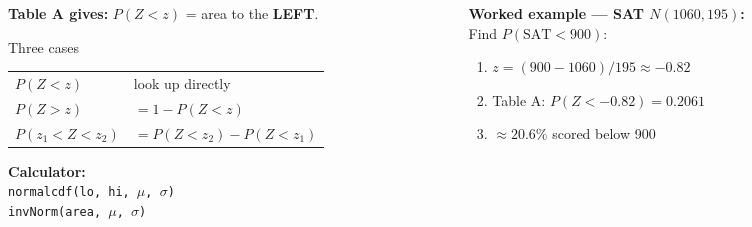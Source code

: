 \documentclass[aspectratio=169, 11pt]{beamer}
\begin{document}
{
\begin{frame}[t, plain]
  \vspace{0.45cm}\par
  \hspace{0.55cm}%
  \begin{minipage}{0.9\textwidth}


    \begin{columns}[T]
      \begin{column}{0.50\textwidth}
        \small
        \textbf{Table A gives:} $P(Z < z)$ = area to the \textbf{LEFT}.

        \vspace{0.5em}
        \begin{block}{Three cases}
          \small
          \renewcommand{\arraystretch}{1.4}
          \begin{tabular}{ll}
          $P(Z < z)$         & look up directly \\
          $P(Z > z)$         & $= 1 - P(Z < z)$ \\
          $P(z_1 < Z < z_2)$ & $= P(Z<z_2) - P(Z<z_1)$ \\
          \end{tabular}
        \end{block}

        \vspace{0.5em}
        \textbf{Calculator:}\\
        \texttt{normalcdf(lo, hi, $\mu$, $\sigma$)}\\
        \texttt{invNorm(area, $\mu$, $\sigma$)}
      \end{column}
      \begin{column}{0.46\textwidth}
        \small
        \textbf{Worked example — SAT $N(1060, 195)$:}\\
        Find $P(\text{SAT} < 900)$:
        \begin{enumerate}
          \setlength{\itemsep}{0.3em}
          \item $z = (900-1060)/195 \approx -0.82$
          \item Table A: $P(Z < -0.82) = 0.2061$
          \item $\approx 20.6\%$ scored below 900
        \end{enumerate}


\end{column}
\end{columns}
\end{minipage}
\end{frame}}
\end{document}
